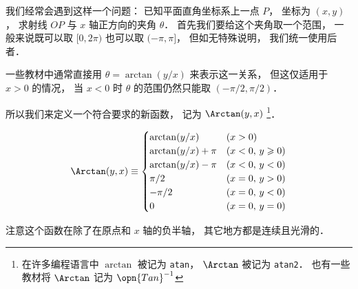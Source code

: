 
我们经常会遇到这样一个问题： 已知平面直角坐标系上一点 $P$， 坐标为 $(x, y)$， 求射线 $OP$ 与 $x$ 轴正方向的夹角 $\theta$．%
首先我们要给这个夹角取一个范围， 一般来说既可以取 $[0, 2\pi)$ 也可以取 $(-\pi, \pi]$， 但如无特殊说明， 我们统一使用后者．

一些教材中通常直接用 $\theta = \arctan(y/x)$ 来表示这一关系， 但这仅适用于 $x > 0$ 的情况， 当 $x < 0$ 时 $\theta$ 的范围仍然只能取 $(-\pi/2, \pi/2)$．

所以我们来定义一个符合要求的新函数， 记为 $\Arctan(y, x)$ \footnote{在许多编程语言中 $\arctan$ 被记为 \lstinline|atan|， $\Arctan$ 被记为 \lstinline|atan2|． 也有一些教材将 $\Arctan$ 记为 $\opn{Tan}^{-1}$}．

\begin{equation}\label{Arctan_eq1}
\Arctan(y,x) \equiv 
\begin{cases}
\arctan (y/x) \quad &(x > 0)\\
\arctan (y/x) + \pi  &(x < 0,\,y \geqslant 0)\\
\arctan (y/x) - \pi  &(x < 0,\,y < 0)\\
\pi /2  &(x = 0, \,y > 0)\\
 -\pi /2  &(x = 0, \,y < 0)\\
0 & (x=0,\,y=0)
\end{cases}
\end{equation}

注意这个函数在除了在原点和 $x$ 轴的负半轴， 其它地方都是连续且光滑的．
